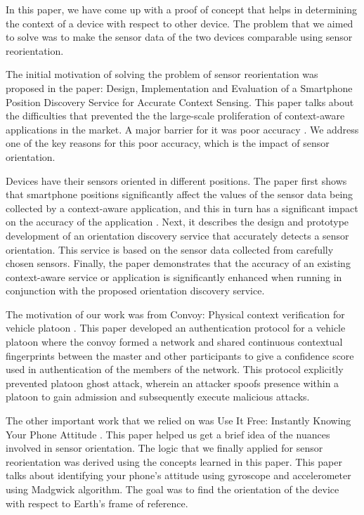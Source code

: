 \documentclass[journal]{IEEEtranTIE}
\begin{document}
In this paper, we have come up with a proof of concept that helps in determining
the context of a device with respect to other device. The problem that we aimed
to solve was to make the sensor data of the two devices comparable using sensor
reorientation.

The initial motivation of solving the problem of sensor reorientation was
proposed in the paper: Design, Implementation and Evaluation of a Smartphone
Position Discovery Service for Accurate Context Sensing. This paper talks about
the difficulties that prevented the the large-scale proliferation of
context-aware applications in the market. A major barrier for it was poor
accuracy \cite{Alanezi}. We address one of the key reasons for this poor
accuracy, which is the impact of sensor orientation.

Devices have their sensors oriented in different positions. The paper first
shows that smartphone positions significantly affect the values of the
sensor data being collected by a context-aware application, and this in turn
has a significant impact on the accuracy of the application \cite{Alanezi}.
Next, it describes the design and prototype development of an orientation
discovery service that accurately detects a sensor orientation. This service is
based on the sensor data collected from carefully chosen sensors. Finally, the
paper demonstrates that the accuracy of an existing context-aware service or
application is significantly enhanced when running in conjunction with the
proposed orientation discovery service.

The motivation of our work was from Convoy: Physical context verification for
vehicle platoon \cite{Han}. This paper developed an authentication protocol for
a vehicle platoon where the convoy formed a network and shared continuous
contextual fingerprints between the master and other participants to give a
confidence score used in authentication of the members of the network. This
protocol explicitly prevented platoon ghost attack, wherein an attacker spoofs
presence within a platoon to gain admission and subsequently execute malicious
attacks.

The other important work that we relied on was Use It Free: Instantly Knowing
Your Phone Attitude \cite{PhoneAttitude}. This paper helped us get a brief idea
of the nuances involved in sensor orientation. The logic that we finally applied
for sensor reorientation was derived using the concepts learned in this paper.
This paper talks about identifying your phone's attitude using gyroscope and
accelerometer using Madgwick algorithm. The goal was to find the orientation of
the device with respect to Earth's frame of reference.
\end{document}
